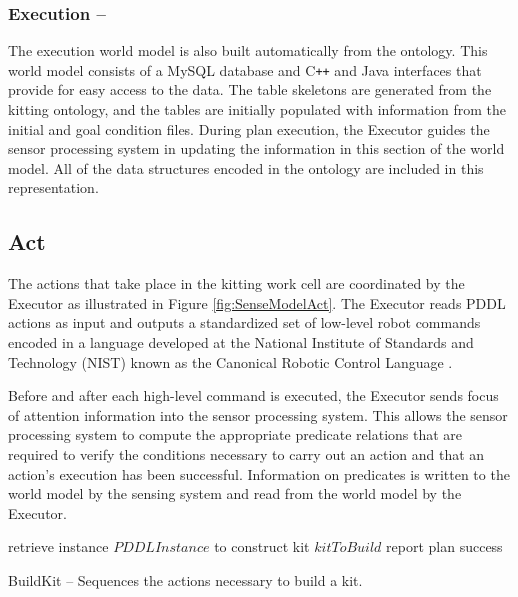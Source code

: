 \subsubsection{Execution --}
The execution world model is also built automatically from the ontology. This world model consists of a MySQL database and C\texttt{++} and Java
interfaces that provide for easy access to the data. The table skeletons are generated from the kitting ontology, and the tables are initially populated
with information from the initial and goal condition files. During plan execution, the Executor guides the sensor processing system
in updating the information in 
this section of the world model. All of the data structures encoded in the ontology are included in this representation. 
%
\subsection{Act}
\label{subsection:Act}
The actions that take place in the kitting work cell are coordinated by the Executor as illustrated in Figure \ref{fig:SenseModelAct}.  The Executor
reads PDDL actions as input and outputs a standardized set of low-level robot commands encoded in a language developed at the National Institute of Standards
and Technology (NIST) known as the  Canonical Robotic Control Language \cite{Balakirsky2012-1}. 

Before and after each high-level command
is executed, the Executor sends focus of attention information into the sensor processing system. This allows the sensor processing system to compute
the appropriate predicate relations that are required to verify the conditions necessary to carry out an action and that an action's execution has
been successful. Information on predicates is written to the world model by the sensing system and read from the world model by the Executor.
%
\\
\begin{algorithm}[h!]

 	retrieve instance $PDDLInstance$ to construct kit $kitToBuild$\;
 	report plan success\;
\caption{{\sc BuildKit} -- Sequences the actions necessary to build a kit.}
\label{fig:buildkit}
\end{algorithm}
%